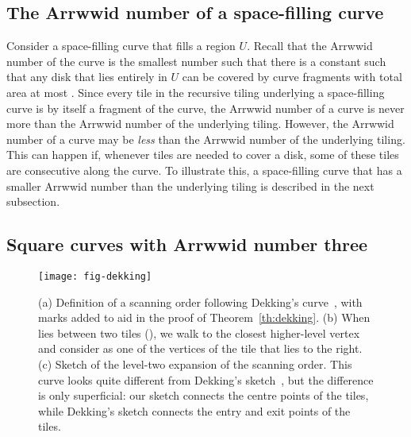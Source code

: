 \documentclass[11pt,a4paper]{article}
\newcommand{\unittile}{\ensuremath{U}\xspace}
\begin{document}
\subsection{The Arrwwid number of a space-filling curve}
Consider a space-filling curve that fills a region \unittile. Recall that the Arrwwid number of the curve is the smallest number  such that there is a constant  such that any disk  that lies entirely in \unittile can be covered by  curve fragments with total area at most . Since every tile in the recursive tiling underlying a space-filling curve is by itself a fragment of the curve, the Arrwwid number of a curve is never more than the Arrwwid number of the underlying tiling. However, the Arrwwid number of a curve may be \emph{less} than the Arrwwid number  of the underlying tiling. This can happen if, whenever  tiles are needed to cover a disk, some of these tiles are consecutive along the curve. To illustrate this, a space-filling curve that has a smaller Arrwwid number than the underlying tiling is described in the next subsection.

\subsection{Square curves with Arrwwid number three}
\label{sec:squarewithA3}

\begin{figure}
\centering
\texttt{[image: fig-dekking]}
\caption{(a) Definition of a scanning order following Dekking's curve~\cite{Dekking1982}, with marks added to aid in the proof of Theorem~\ref{th:dekking}. (b) When  lies between two tiles (), we walk to the closest higher-level vertex  and consider  as one of the vertices of the tile that lies to the right. (c) Sketch of the level-two expansion of the scanning order. This curve looks quite different from Dekking's sketch~\cite{Dekking1982}, but the difference is only superficial: our sketch connects the centre points of the tiles, while Dekking's sketch connects the entry and exit points of the tiles.}
\label{fig:dekking}
\end{figure}
\end{document}
